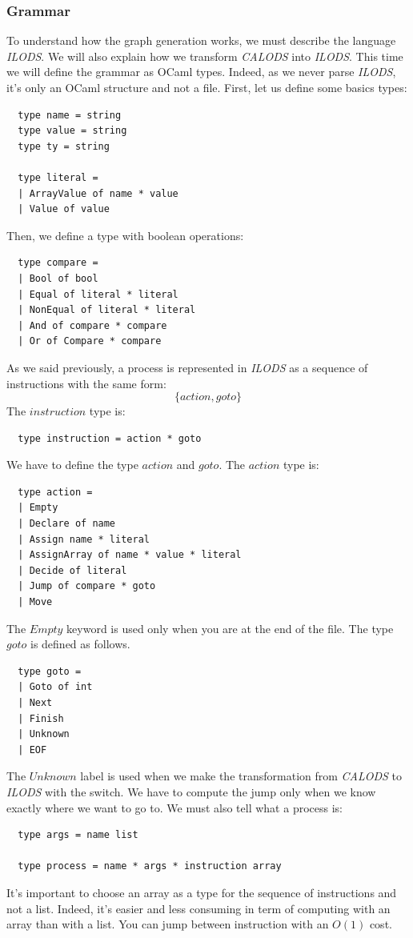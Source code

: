 \documentclass{article}
\begin{document}
\subsubsection{Grammar}
To understand how the graph generation works, we must describe the language \textit{ILODS}. We will also explain how we transform \textit{CALODS} into \textit{ILODS}. This time we will define the grammar as OCaml types. Indeed, as we never parse \textit{ILODS}, it's only an OCaml structure and not a file. First, let us define some basics types:
\begin{lstlisting}
  type name = string
  type value = string
  type ty = string
  
  type literal = 
  | ArrayValue of name * value
  | Value of value      
\end{lstlisting}
Then, we define a type with boolean operations:
\begin{lstlisting}
  type compare =
  | Bool of bool
  | Equal of literal * literal
  | NonEqual of literal * literal
  | And of compare * compare
  | Or of Compare * compare
\end{lstlisting}
As we said previously, a process is represented in \textit{ILODS} as a sequence of instructions with the same form:
$$ \lbrace action, goto \rbrace $$
The $instruction$ type is:
\begin{lstlisting}
  type instruction = action * goto
\end{lstlisting}
We have to define the type $action$ and $goto$. The $action$ type is: 
\begin{lstlisting}
  type action =
  | Empty
  | Declare of name
  | Assign name * literal
  | AssignArray of name * value * literal
  | Decide of literal
  | Jump of compare * goto
  | Move
\end{lstlisting}
The $Empty$ keyword is used only when you are at the end of the file. The type $goto$ is defined as follows.
\begin{lstlisting}
  type goto =
  | Goto of int
  | Next
  | Finish
  | Unknown
  | EOF
\end{lstlisting}
The $Unknown$ label is used when we make the transformation from \textit{CALODS} to \textit{ILODS} with the switch. We have to compute the jump only when we know exactly where we want to go to. We must also tell what a process is:
\begin{lstlisting}
  type args = name list

  type process = name * args * instruction array
\end{lstlisting}
It's important to choose an array as a type for the sequence of instructions and not a list. Indeed, it's easier and less consuming in term of computing with an array than with a list. You can jump between instruction with an $O(1)$ cost.
\end{document}
